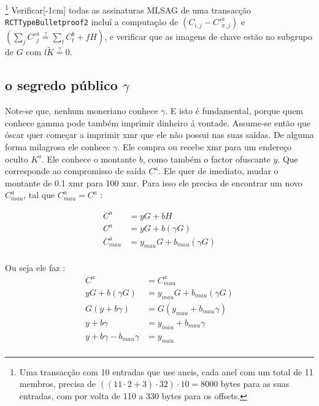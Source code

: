 \footnote{Uma transacção com 10 entradas que use aneis, cada anel com um total de 11 membros, precisa de \(((11 \cdot 2 + 3) \cdot 32) \cdot 10 = 8000 \) bytes para as suas entradas, com por volta de 110 a 330 bytes para os offsets.}
Verificar[-1cm] todas as assinaturas MLSAG de uma transacção {\tt RCTTypeBulletproof2} 
incluí a computação de \( (C_{i, j} - C'^a_{\pi, j}) \) e \( (\sum_j C'^a_{j} \stackrel{?}{=} \sum_t C^b_{t} + f H)\), e verificar que as imagens de chave estão no subgrupo de $G$ com $l \tilde{K} \stackrel{?}{=} 0$. 

\subsection{o segredo público $\gamma$}
\label{gamma}


Note-se que, nenhum moneriano conhece $\gamma$. E isto é fundamental, porque quem conhece gamma pode também imprimir dinheiro á vontade. Assume-se então que óscar quer começar a imprimir xmr que ele não possui nas suas saídas. De alguma forma milagrosa ele conhece $\gamma$. Ele compra ou recebe xmr para um endereço oculto $K^o$. Ele conhece o montante $b$, como também o factor ofuscante $y$. Que corresponde ao compromisso de saída $C^a$.
Ele quer de imediato, mudar o montante de 0.1 xmr para 100 xmr. Para isso ele precisa de encontrar um novo $C^a_{mau}$, tal que $C^a_{mau} = C^a$ :

\begin{align*}
C^a &= y G + b H\\
C^a &= y G + b (\gamma G)\\
C^a_{mau} &= y_{mau} G + b_{mau} (\gamma G)\\
\end{align*}

Ou seja ele faz :
\begin{align*}
C^a &= C^a_{mau}\\
y G + b (\gamma G) &= y_{mau} G + b_{mau} (\gamma G) \\
G (y + b\gamma) &= G (y_{mau} + b_{mau}\gamma) \\
y + b\gamma &= y_{mau} + b_{mau}\gamma \\
y + b\gamma - b_{mau}\gamma &= y_{mau} \\
\end{align*}

